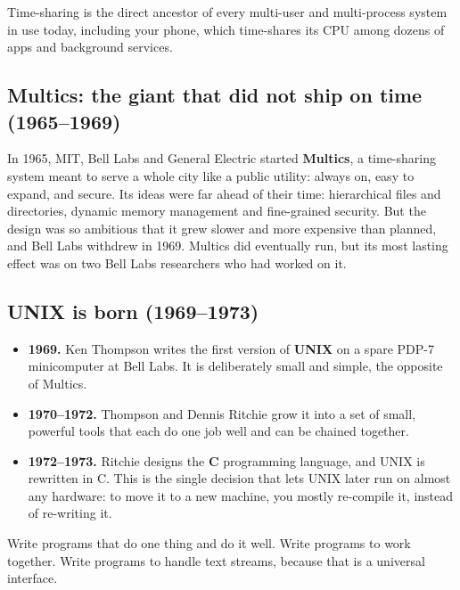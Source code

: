 \documentclass[11pt,a4paper]{article}
\newcommand{\term}[1]{\textbf{\color{mintdeep}#1}}
\begin{document}
Time-sharing is the direct ancestor of every multi-user and multi-process system in use today, including your phone, which time-shares its CPU among dozens of apps and background services.

\subsection{Multics: the giant that did not ship on time (1965--1969)}

In 1965, MIT, Bell Labs and General Electric started \term{Multics}, a time-sharing system meant to serve a whole city like a public utility: always on, easy to expand, and secure. Its ideas were far ahead of their time: hierarchical files and directories, dynamic memory management and fine-grained security. But the design was so ambitious that it grew slower and more expensive than planned, and Bell Labs withdrew in 1969. Multics did eventually run, but its most lasting effect was on two Bell Labs researchers who had worked on it.

\subsection{UNIX is born (1969--1973)}

\begin{itemize}
  \item \textbf{1969.} Ken Thompson writes the first version of \term{UNIX} on a spare PDP-7 minicomputer at Bell Labs. It is deliberately small and simple, the opposite of Multics.
  \item \textbf{1970--1972.} Thompson and Dennis Ritchie grow it into a set of small, powerful tools that each do one job well and can be chained together.
  \item \textbf{1972--1973.} Ritchie designs the \textbf{C} programming language, and UNIX is rewritten in C. This is the single decision that lets UNIX later run on almost any hardware: to move it to a new machine, you mostly re-compile it, instead of re-writing it.
\end{itemize}

\begin{keyidea}
Write programs that do one thing and do it well. Write programs to work together. Write programs to handle text streams, because that is a universal interface.
\end{keyidea}
\end{document}
